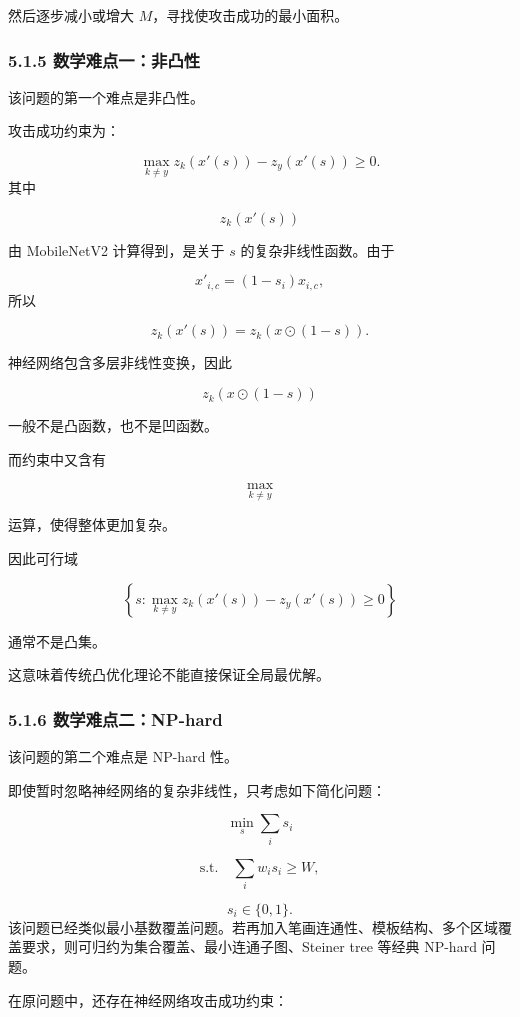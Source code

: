 ﻿\documentclass[UTF8,zihao=-4,fontset=none]{ctexart}
\begin{document}
然后逐步减小或增大 \(M\)，寻找使攻击成功的最小面积。

\subsubsection*{5.1.5 数学难点一：非凸性}
{}

该问题的第一个难点是非凸性。

攻击成功约束为：

\[
\max_{k\ne y}z_k(x'(s))-z_y(x'(s))\ge 0.
\]
\noindent 其中

\[
z_k(x'(s))
\]

由 MobileNetV2 计算得到，是关于 \(s\) 的复杂非线性函数。由于

\[
x'_{i,c}=(1-s_i)x_{i,c},
\]
\noindent 所以

\[
z_k(x'(s))
=
z_k(x\odot(1-s)).
\]

神经网络包含多层非线性变换，因此

\[
z_k(x\odot(1-s))
\]

一般不是凸函数，也不是凹函数。

而约束中又含有

\[
\max_{k\ne y}
\]

运算，使得整体更加复杂。

因此可行域

\[
\left\{
s:
\max_{k\ne y}z_k(x'(s))-z_y(x'(s))\ge 0
\right\}
\]

通常不是凸集。

这意味着传统凸优化理论不能直接保证全局最优解。

\subsubsection*{5.1.6 数学难点二：NP-hard}
{}

该问题的第二个难点是 NP-hard 性。

即使暂时忽略神经网络的复杂非线性，只考虑如下简化问题：

\[
\min_s\sum_i s_i
\]

\[
\mathrm{s.t.}
\quad
\sum_i w_i s_i\ge W,
\]

\[
s_i\in\{0,1\}.
\]
\noindent 该问题已经类似最小基数覆盖问题。若再加入笔画连通性、模板结构、多个区域覆盖要求，则可归约为集合覆盖、最小连通子图、Steiner tree 等经典 NP-hard 问题。

在原问题中，还存在神经网络攻击成功约束：
\end{document}

